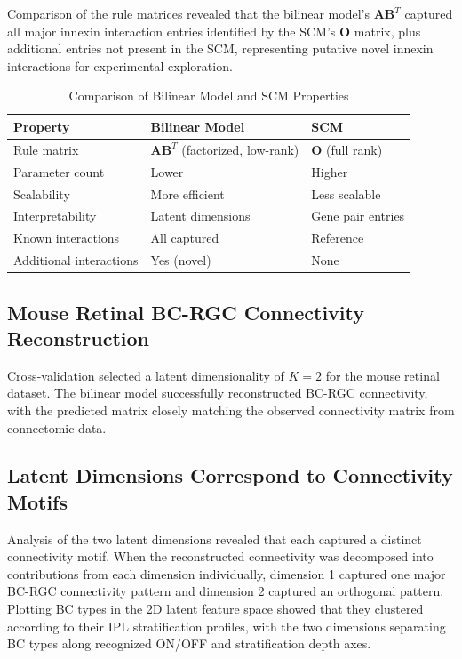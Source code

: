 \documentclass[11pt]{article}
\begin{document}
Comparison of the rule matrices revealed that the bilinear model's $\mathbf{AB}^T$ captured all major innexin interaction entries identified by the SCM's $\mathbf{O}$ matrix, plus additional entries not present in the SCM, representing putative novel innexin interactions for experimental exploration.

\begin{table}[ht]
\centering
\caption{Comparison of Bilinear Model and SCM Properties}
\label{tab:comparison}
\begin{tabular}{lll}
\toprule
\textbf{Property} & \textbf{Bilinear Model} & \textbf{SCM} \\
\midrule
Rule matrix & $\mathbf{AB}^T$ (factorized, low-rank) & $\mathbf{O}$ (full rank) \\
Parameter count & Lower & Higher \\
Scalability & More efficient & Less scalable \\
Interpretability & Latent dimensions & Gene pair entries \\
Known interactions & All captured & Reference \\
Additional interactions & Yes (novel) & None \\
\bottomrule
\end{tabular}
\end{table}

\subsection{Mouse Retinal BC-RGC Connectivity Reconstruction}

Cross-validation selected a latent dimensionality of $K = 2$ for the mouse retinal dataset. The bilinear model successfully reconstructed BC-RGC connectivity, with the predicted matrix closely matching the observed connectivity matrix from connectomic data.

\subsection{Latent Dimensions Correspond to Connectivity Motifs}

Analysis of the two latent dimensions revealed that each captured a distinct connectivity motif. When the reconstructed connectivity was decomposed into contributions from each dimension individually, dimension 1 captured one major BC-RGC connectivity pattern and dimension 2 captured an orthogonal pattern. Plotting BC types in the 2D latent feature space showed that they clustered according to their IPL stratification profiles, with the two dimensions separating BC types along recognized ON/OFF and stratification depth axes.
\end{document}
